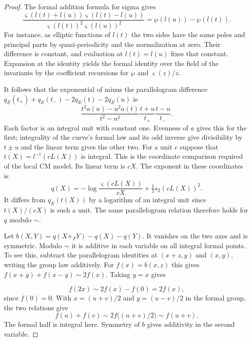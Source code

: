 \begin{proof}

The formal addition formula for sigma gives
\[
 \frac{\varsigma(l(t)+l(u))\varsigma(l(t)-l(u))}
      {\varsigma(l(t))^2\varsigma(l(u))^2}=\wp(l(u))-\wp(l(t)).
\]
For instance, as elliptic functions of \(l(t)\) the two sides
have the same poles and principal parts by quasi-periodicity
and the normalization at zero. Their difference is constant,
and evaluation at \(l(t)=l(u)\) fixes that constant. Expansion
at the identity yields the formal identity over the field of
the invariants by the coefficient recursions for \(\wp\) and
\(\varsigma(z)/z\).

It follows that the exponential of minus the parallelogram
difference \(q_E(t_+)+q_E(t_-)-2q_E(t)-2q_E(u)\) is
\[
 \frac{t^2a(u)-u^2a(t)}{t^2-u^2}
                   \frac{t+u}{t_+}\frac{t-u}{t_-}.
\]
Each factor is an integral unit with constant one. Evenness
of \(a\) gives this for the first; integrality of the curve's
formal law and its odd inverse give divisibility by \(t\pm u\)
and the linear term gives the other two. For a unit \(c\)
suppose that \(t(X)=l^{-1}(cL(X))\) is integral. This is the
coordinate comparison required of the local CM model. Its
linear term is \(cX\). The exponent in these coordinates is
\[
           q(X)=-\log\frac{\varsigma(cL(X))}{cX}
                                    +\tfrac12s_2(cL(X))^2 .
\]
It differs from \(q_E(t(X))\) by a logarithm of an integral unit
since \(t(X)/(cX)\) is such a unit. The same parallelogram
relation therefore holds for \(q\) modulo \(\sim\).


Let \(b(X,Y)=q(X+_FY)-q(X)-q(Y)\). It vanishes on the two
axes and is symmetric. Modulo \(\sim\) it is additive in each
variable on all integral formal points. To see this, subtract
the parallelogram identities at \((x+z,y)\) and \((x,y)\),
writing the group law additively. For \(f(x)=b(x,z)\) this gives
\(f(x+y)+f(x-y)\sim2f(x)\). Taking \(y=x\) gives

\[
  f(2x)\sim2f(x)-f(0)=2f(x),
\]
 since \(f(0)=0\). With \(x=(u+v)/2\) and \(y=(u-v)/2\) in the formal group, the two
relations give
\[
 f(u)+f(v)\sim 2f\bigl((u+v)/2\bigr)\sim f(u+v).
\]
The formal half is integral here. Symmetry of \(b\) gives additivity
in the second variable.



\end{proof}
